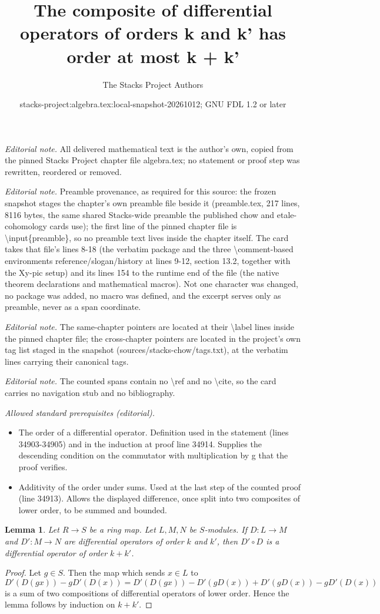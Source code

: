 \documentclass[10pt,a4paper]{amsart}
\title{The composite of differential operators of orders k and k' has order at most k + k'}
\author{The Stacks Project Authors}
\date{stacks-project:algebra.tex:local-snapshot-20261012; GNU FDL 1.2 or later}
\theoremstyle{plain}
\newtheorem{lemma}[subsection]{Lemma}
\theoremstyle{definition}
\theoremstyle{remark}
\numberwithin{equation}{subsection}
\begin{document}
\maketitle
\noindent\textit{Editorial note.} All delivered mathematical text is the author's own, copied from the pinned Stacks Project chapter file algebra.tex; no statement or proof step was rewritten, reordered or removed.\par\medskip
\noindent\textit{Editorial note.} Preamble provenance, as required for this source: the frozen snapshot stages the chapter's own preamble file beside it (preamble.tex, 217 lines, 8116 bytes, the same shared Stacks-wide preamble the published chow and etale-cohomology cards use); the first line of the pinned chapter file is \textbackslash{}input\{preamble\}, so no preamble text lives inside the chapter itself. The card takes that file's lines 8-18 (the verbatim package and the three \textbackslash{}comment-based environments reference/slogan/history at lines 9-12, section 13.2, together with the Xy-pic setup) and its lines 154 to the runtime end of the file (the native theorem declarations and mathematical macros). Not one character was changed, no package was added, no macro was defined, and the excerpt serves only as preamble, never as a span coordinate.\par\medskip
\noindent\textit{Editorial note.} The same-chapter pointers are located at their \textbackslash{}label lines inside the pinned chapter file; the cross-chapter pointers are located in the project's own tag list staged in the snapshot (sources/stacks-chow/tags.txt), at the verbatim lines carrying their canonical tags.\par\medskip
\noindent\textit{Editorial note.} The counted spans contain no \textbackslash{}ref and no \textbackslash{}cite, so the card carries no navigation stub and no bibliography.\par\medskip
\noindent\textit{Allowed standard prerequisites (editorial).}\begin{itemize}
\item The order of a differential operator. Definition used in the statement (lines 34903-34905) and in the induction at proof line 34914. Supplies the descending condition on the commutator with multiplication by g that the proof verifies.
\item Additivity of the order under sums. Used at the last step of the counted proof (line 34913). Allows the displayed difference, once split into two composites of lower order, to be summed and bounded.
\end{itemize}\medskip
\begin{lemma}
\label{lemma-composition-differential-operators}
Let $R \to S$ be a ring map. Let $L, M, N$ be $S$-modules.
If $D : L \to M$ and $D' : M \to N$ are differential
operators of order $k$ and $k'$, then $D' \circ D$ is a
differential operator of order $k + k'$.
\end{lemma}

\begin{proof}
Let $g \in S$. Then the map which sends $x \in L$ to
$$
D'(D(gx)) - gD'(D(x)) = D'(D(gx)) - D'(gD(x)) + D'(gD(x)) - gD'(D(x))
$$
is a sum of two compositions of differential operators of lower order.
Hence the lemma follows by induction on $k + k'$.
\end{proof}
\end{document}
